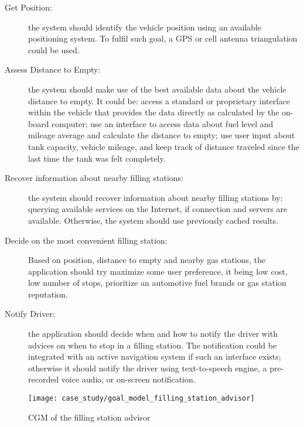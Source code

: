 \begin{description}
  \item[Get Position:]
  the system should identify the vehicle position using an available positioning system. To fulfil such goal, a GPS or cell antenna triangulation could be used.

  \item[Assess Distance to Empty:]
  the system should make use of the best available data about the vehicle distance to empty. It could be: access a standard or proprietary interface within the vehicle that provides the data directly as calculated by the on-board computer; use an interface to access data about fuel level and mileage average and calculate the distance to empty; use user input about tank capacity, vehicle mileage, and keep track of distance traveled since the last time the tank was felt completely.

  \item[Recover information about nearby filling stations:]
  the system should recover information about nearby filling stations by: querying available services on the Internet, if connection and servers are available. Otherwise, the system should use previously cached results.

  \item[Decide on the most convenient filling station:]
  Based on position, distance to empty and nearby gas stations, the application should try maximize some user preference, it being low cost, low number of stops, prioritize an automotive fuel brands or gas station reputation.

  \item[Notify Driver:] the application should decide when and how to notify the driver with advices on when to stop in a filling station. The notification could be integrated with an active navigation system if such an interface exists; otherwise it should notify the driver using text-to-speech engine, a pre-recorded voice audio, or on-screen notification.

\end{description}


\begin{figure*}[!htb]
 \centering
 \texttt{[image: case\_study/goal\_model\_filling\_station\_advisor]}
 \caption{CGM of the filling station advisor}
\label{fig:goal_model_filling_station_advisor}
\end{figure*}

